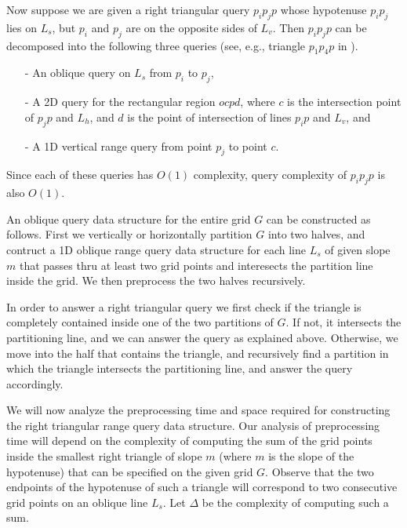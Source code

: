 Now suppose we are given a right triangular query $p_i p_j p$ whose
hypotenuse $p_i p_j$ lies on $L_s$, but $p_i$ and $p_j$ are on the
opposite sides of $L_v$. Then $p_i p_j p$ can be decomposed into
the following three queries (see, e.g., triangle $p_1 p_4 p$ in
).
%
\begin{itemize}
%
\item[-] An oblique query on $L_s$ from $p_i$ to $p_j$,
%
\item[-] A 2D query for the rectangular region $ocpd$, where $c$ is
the intersection point of $p_j p$ and $L_h$, and $d$ is the point of
intersection of lines $p_i p$ and $L_v$, and
%
\item[-] A 1D vertical range query from point $p_j$ to point $c$.
%
\end{itemize}
 
Since each of these queries has $O(1)$ complexity, query complexity of
$p_i p_j p$ is also $O(1)$.

An oblique query data structure for the entire grid $G$ can be constructed
as follows. First we vertically or horizontally partition $G$ into two
halves, and contruct a 1D oblique range query data structure for each
line $L_s$ of given slope $m$ that passes thru at least two grid points
and interesects the partition line inside the grid. We then preprocess
the two halves recursively.

In order to answer a right triangular query we first check if the
triangle is completely contained inside one of the two partitions of
$G$. If not, it intersects the partitioning line, and we can answer the
query as explained above. Otherwise, we move into the half that contains
the triangle, and recursively find a partition in which the triangle
intersects the partitioning line, and answer the query accordingly.

We will now analyze the preprocessing time and space required for
constructing the right triangular range query data structure. Our analysis
of preprocessing time will depend on the complexity of computing the
sum of the grid points inside the smallest right triangle of slope $m$
(where $m$ is the slope of the hypotenuse) that can be specified on the
given grid $G$. Observe that the two endpoints of the hypotenuse of such
a triangle will correspond to two consecutive grid points on an oblique
line $L_s$. Let $\Delta$ be the complexity of computing such a sum.

